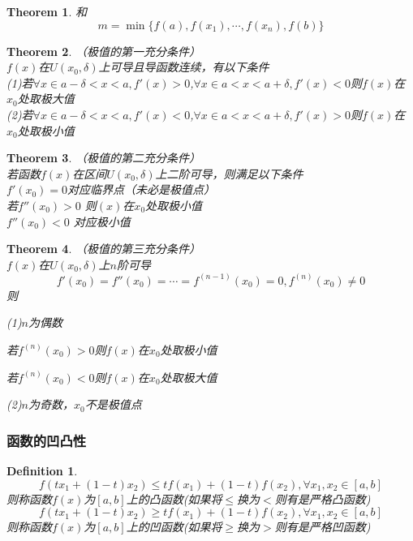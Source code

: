 \documentclass[11pt,hyperref,a4paper,UTF8]{ctexart}
\newtheorem{theorem}{Theorem}[subsection]
\newtheorem{definition}{Definition}[subsection]
\begin{document}
\begin{CJK}{UTF8}{gkai}
\begin{theorem}
  和
  \[m = \min\{f(a),f(x_1),\cdots,f(x_n),f(b)\}\]
\end{theorem}

\begin{theorem}（极值的第一充分条件）\\
$f(x)$在$U(x_0,\delta)$上可导且导函数连续，有以下条件\\
(1)若$\forall x\in a-\delta<x<a,f'(x) > 0$,$\forall x\in a<x<a + \delta,f'(x) < 0$则$f(x)$在$x_0$处取极大值\\
(2)若$\forall x\in a-\delta<x<a,f'(x) < 0$,$\forall x\in a<x<a + \delta,f'(x) > 0$则$f(x)$在$x_0$处取极小值\\
\end{theorem}

\begin{theorem}（极值的第二充分条件）\\
若函数$f(x)$在区间$U(x_0,\delta)$上二阶可导，则满足以下条件\\
$f'(x_0) = 0$对应临界点（未必是极值点）\\
若$f''(x_0) > 0$ 则$(x)$在$x_0$处取极小值\\
$f''(x_0) < 0$ 对应极小值\\
\end{theorem}

\begin{theorem}（极值的第三充分条件）\\

$f(x)$在$U(x_0,\delta)$上$n$阶可导
\[f'(x_0) = f''(x_0) = \cdots =f^{(n-1)}(x_0) = 0,f^{(n)}(x_0)\neq 0\]
则

(1)$n$为偶数

若$f^{(n)}(x_0) > 0$则$f(x)$在$x_0$处取极小值

若$f^{(n)}(x_0) < 0$则$f(x)$在$x_0$处取极大值

(2)$n$为奇数，$x_0$不是极值点
\end{theorem}

\subsubsection{函数的凹凸性}

\begin{definition}
\[f(tx_1 + (1-t)x_2)  \leq tf(x_1) + (1-t) f(x_2),\forall x_1 ,x_2 \in [a,b]\]
则称函数$f(x)$为$[a,b]$上的凸函数(如果将$\leq$换为$<$则有是严格凸函数)\\

\[f(tx_1 + (1-t)x_2)  \geq tf(x_1) + (1-t) f(x_2),\forall x_1 ,x_2 \in [a,b]\]
则称函数$f(x)$为$[a,b]$上的凹函数(如果将$\geq$换为$>$则有是严格凹函数)\\
\end{definition}


\end{CJK}
\end{document}
